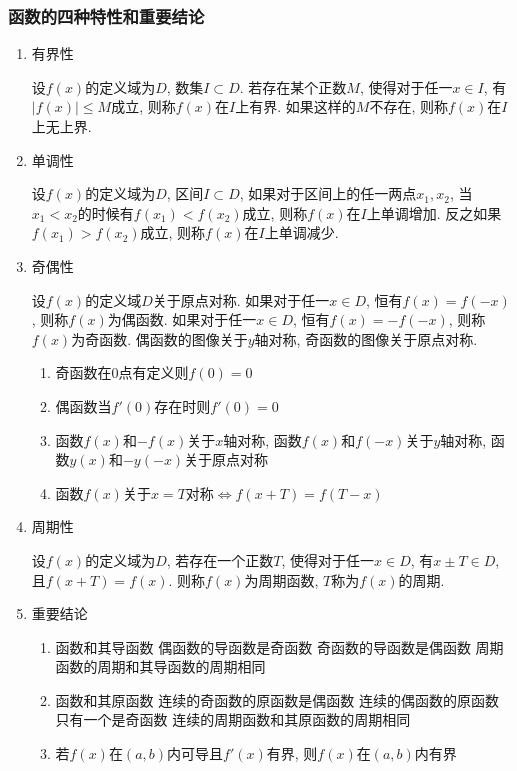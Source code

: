 \subsubsection{函数的四种特性和重要结论}
\begin{enumerate}
    \item 有界性\par
          设$ f(x) $的定义域为$ D $, 数集$ I\subset D $. 若存在某个正数$ M $, 使得对于任一$ x\in I $, 有$ |f(x)|\le M $成立, 则称$ f(x) $在$ I $上有界. 如果这样的$ M $不存在, 则称$ f(x) $在$ I $上无上界.
    \item 单调性\par
          设$ f(x) $的定义域为$ D $, 区间$ I\subset D $, 如果对于区间上的任一两点$ x_{1},x_{2} $, 当$ x_{1}<x_{2} $的时候有$ f(x_{1})<f(x_{2}) $成立, 则称$ f(x) $在$ I $上单调增加. 反之如果$ f(x_{1})>f(x_{2}) $成立, 则称$ f(x) $在$ I $上单调减少.
    \item 奇偶性\par
          设$ f(x) $的定义域$ D $关于原点对称. 如果对于任一$ x\in D $, 恒有$ f(x)=f(-x) $, 则称$ f(x) $为偶函数. 如果对于任一$ x\in D $, 恒有$ f(x)=-f(-x) $, 则称$ f(x) $为奇函数. 偶函数的图像关于$ y $轴对称, 奇函数的图像关于原点对称.
          \begin{tcolorbox}
              \begin{enumerate}
                  \item 奇函数在$ 0 $点有定义则$ f(0)=0 $
                  \item 偶函数当$ f'(0) $存在时则$ f'(0)=0 $
                  \item 函数$ f(x) $和$ -f(x) $关于$ x $轴对称, 函数$ f(x) $和$ f(-x) $关于$ y $轴对称, 函数$ y(x) $和$ -y(-x) $关于原点对称
                  \item 函数$ f(x) $关于$ x=T $对称$ \Leftrightarrow f(x+T)=f(T-x) $
              \end{enumerate}
          \end{tcolorbox}
    \item 周期性\par
          设$ f(x) $的定义域为$ D $, 若存在一个正数$ T $, 使得对于任一$ x\in D $, 有$ x\pm T\in D $, 且$ f(x+T)=f(x) $. 则称$ f(x) $为周期函数, $ T $称为$ f(x) $的周期.
    \item 重要结论
          \begin{enumerate}
              \item 函数和其导函数
                    \subitem 偶函数的导函数是奇函数
                    \subitem 奇函数的导函数是偶函数
                    \subitem 周期函数的周期和其导函数的周期相同
              \item 函数和其原函数
                    \subitem 连续的奇函数的原函数是偶函数
                    \subitem 连续的偶函数的原函数只有一个是奇函数
                    \subitem 连续的周期函数和其原函数的周期相同
              \item 若$ f(x) $在$ (a,b) $内可导且$ f'(x) $有界, 则$ f(x) $在$ (a,b) $内有界
          \end{enumerate}
\end{enumerate}

